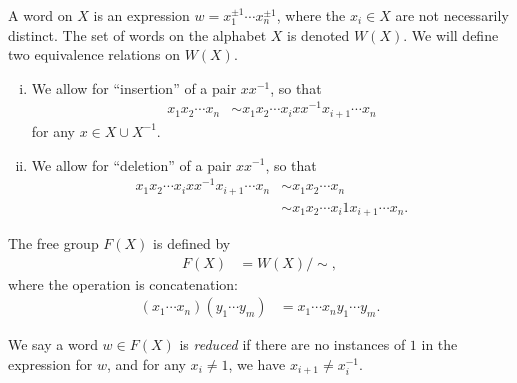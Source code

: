 \documentclass[10pt]{mypackage}
\begin{document}
A word on $X$ is an expression $w = x_1^{\pm 1}\cdots x_n^{\pm 1}$, where the $x_i\in X$ are not necessarily distinct. The set of words on the alphabet $X$ is denoted $W(X)$. We will define two equivalence relations on $W(X)$.
\begin{enumerate}[(i)]
  \item We allow for ``insertion'' of a pair $xx^{-1}$, so that
    \begin{align*}
      x_1x_2\cdots x_n &\sim x_1x_2\cdots x_i xx^{-1}x_{i+1}\cdots x_n
    \end{align*}
    for any $x\in X\cup X^{-1}$.
  \item We allow for ``deletion'' of a pair $xx^{-1}$, so that
    \begin{align*}
      x_1x_2\cdots x_i xx^{-1}x_{i+1}\cdots x_n &\sim x_1x_2\cdots x_n\\
                                                &\sim x_1x_2\cdots x_i 1 x_{i+1} \cdots x_n.
    \end{align*}
\end{enumerate}
\begin{definition}
  The free group $F(X)$ is defined by
  \begin{align*}
    F(X) &= W(X)/\sim,
  \end{align*}
  where the operation is concatenation:
  \begin{align*}
    \left( x_1\cdots x_n \right)\left( y_1\cdots y_m \right) &= x_1\cdots x_ny_1\cdots y_m.
  \end{align*}
\end{definition}
We say a word $w\in F(X)$ is \textit{reduced} if there are no instances of $1$ in the expression for $w$, and for any $x_i\neq 1$, we have $x_{i+1}\neq x_i^{-1}$.%
\end{document}
